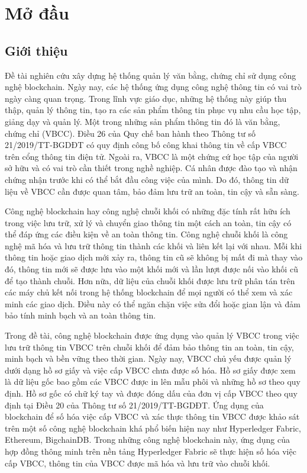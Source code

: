 \chapter{Mở đầu}

\section{Giới thiệu}

Đề tài nghiên cứu xây dựng hệ thống quản lý văn bằng, chứng chỉ sử dụng công nghệ blockchain.
Ngày nay, các hệ thống ứng dụng công nghệ thông tin có vai trò ngày càng quan trọng.
Trong lĩnh vực giáo dục, những hệ thống này giúp thu thập, quản lý thông tin, tạo ra các sản phẩm thông tin phục vụ nhu cầu học tập, giảng dạy và quản lý.
Một trong những sản phẩm thông tin đó là văn bằng, chứng chỉ (VBCC).
Điều 26 của Quy chế ban hành theo Thông tư số 21/2019/TT-BGDĐT  có quy định công bố công khai thông tin về cấp VBCC trên cổng thông tin điện tử.
Ngoài ra, VBCC là một chứng cứ học tập của người sở hữu và có vai trò cần thiết trong nghề nghiệp.
Cá nhân được đào tạo và nhận chứng nhận trước khi có thể bắt đầu công việc của mình.
Do đó, thông tin dữ liệu về VBCC cần được quan tâm, bảo đảm lưu trữ an toàn, tin cậy và sẵn sàng.

Công nghệ blockchain hay công nghệ chuỗi khối có những đặc tính rất hữu ích trong việc lưu trữ, xử lý và chuyển giao thông tin một cách an toàn, tin cậy có thể đáp ứng các điều kiện về an toàn thông tin.
Công nghệ chuỗi khối là công nghệ mã hóa và lưu trữ thông tin thành các khối và liên kết lại với nhau.
Mỗi khi thông tin hoặc giao dịch mới xảy ra, thông tin cũ sẽ không bị mất đi mà thay vào đó, thông tin mới sẽ được lưu vào một khối mới và lần lượt được nối vào khối cũ để tạo thành chuỗi.
Hơn nữa, dữ liệu của chuỗi khối được lưu trữ phân tán trên các máy chủ kết nối trong hệ thống blockchain để mọi người có thể xem và xác minh các giao dịch. Điều này có thể ngăn chặn việc sửa đổi hoặc gian lận và đảm bảo tính minh bạch và an toàn thông tin.

Trong đề tài, công nghệ blockchain được ứng dụng vào quản lý VBCC trong việc lưu trữ thông tin VBCC trên chuỗi khối để đảm bảo thông tin an toàn, tin cậy, minh bạch và bền vững theo thời gian.
Ngày nay, VBCC chủ yếu được quản lý dưới dạng hồ sơ giấy và việc cấp VBCC chưa được số hóa.
Hồ sơ giấy được xem là dữ liệu gốc bao gồm các VBCC được in lên mẫu phôi và những hồ sơ theo quy định. Hồ sơ gốc có chữ ký tay và được đóng dấu của đơn vị cấp VBCC theo quy định tại Điều 20 của Thông tư số 21/2019/TT-BGDĐT.
Ứng dụng của blockchain để số hóa việc cấp VBCC và xác thực thông tin VBCC được khảo sát trên một số công nghệ blockchain khá phổ biến hiện nay như Hyperledger Fabric, Ethereum, BigchainDB.
Trong những công nghệ blockchain này, ứng dụng của hợp đồng thông minh trên nền tảng Hyperledger Fabric sẽ thực hiện số hóa việc cấp VBCC, thông tin của VBCC được mã hóa và lưu trữ vào chuỗi khối.

